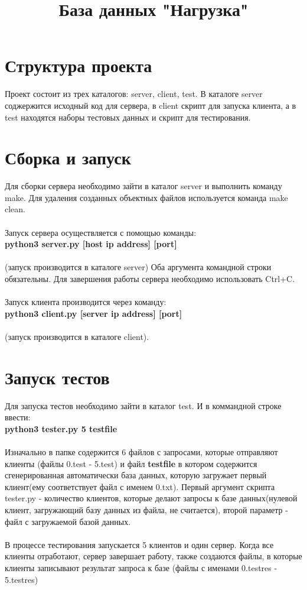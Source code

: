 \documentclass[11pt]{article}
\title{\textbf{База данных "Нагрузка"}}
\date{{}}
\begin{document}
\maketitle
\thispagestyle{empty}
\section{Структура проекта}
Проект состоит из трех каталогов: server, client, test.
В каталоге server соджержится исходный код для сервера, в client скрипт для запуска клиента, а в test находятся наборы тестовых данных и скрипт для тестирования.
\section{Сборка и запуск}
Для сборки сервера необходимо зайти в каталог server и выполнить команду make. Для удаления созданных объектных файлов используется команда make clean.\\\\
Запуск сервера осуществляется с помощью команды:\\\textbf{python3 server.py [host ip address] [port]}\\\\ (запуск производится в каталоге server) Оба аргумента командной строки обязательны. Для завершения работы сервера необходимо использовать Ctrl+C.\\\\
Запуск клиента производится через команду:\\\textbf{python3 client.py [server ip address] [port]}\\\\
(запуск производится в каталоге client).

\section{Запуск тестов}
	Для запуска тестов необходимо зайти в каталог test. И в коммандной строке ввести:\\\textbf{python3 tester.py 5 testfile}\\\\Изначально в папке содержится 6 файлов с запросами, которые отправляют клиенты (файлы 0.test - 5.test) и файл \textbf{testfile} в котором содержится сгенерированная автоматически база данных, которую загружает первый клиент(ему соответствует файл с именем 0.txt). Первый аргумент скрипта tester.py - количество клиентов, которые делают запросы к базе данных(нулевой клиент, загружающий базу данных из файла, не считается), второй параметр - файл с загружаемой базой данных.\\\\В процессе тестирования запускается 5 клиентов и один сервер. Когда все клиенты отработают, сервер завершает работу, также создаются файлы, в которые клиенты записывают результат запроса к базе (файлы с именами 0.test\textunderscore{}res - 5.test\textunderscore{}res)
\end{document}
